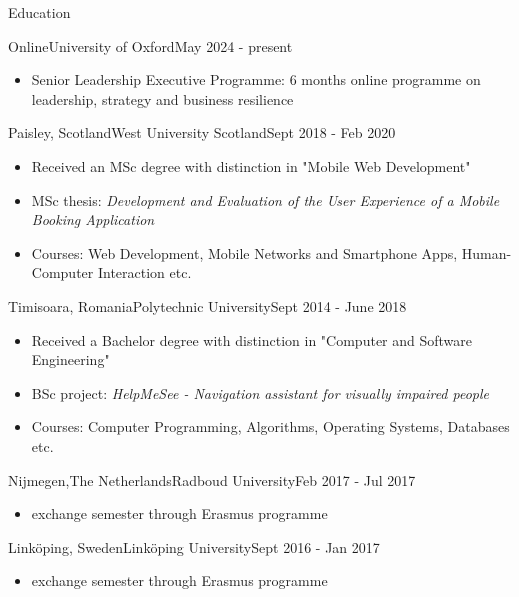 \documentclass[]{mcdowellcv}
\begin{document}
	\begin{cvsection}{Education}
		\begin{cvsubsection}{Online}{University of Oxford}{May 2024 - present}
			\begin{itemize}
			 \item Senior Leadership Executive Programme: 6 months online programme on leadership, strategy and business resilience
		 \end{itemize}
	   \end{cvsubsection}

		\begin{cvsubsection}{Paisley, Scotland}{West University Scotland}{Sept 2018 - Feb 2020}
       		\begin{itemize}
            	\item Received an MSc degree with distinction in "Mobile Web Development"
        		\item MSc thesis: \textit{Development and Evaluation of the User Experience of a Mobile Booking Application}
				\item Courses: Web Development, Mobile Networks and Smartphone Apps, Human-Computer Interaction etc.
			\end{itemize}
		\end{cvsubsection}

		\begin{cvsubsection}{Timisoara, Romania}{Polytechnic University}{Sept 2014 - June 2018}
			\begin{itemize}
				\item Received a Bachelor degree with distinction in "Computer and Software Engineering"
				\item BSc project: \textit{HelpMeSee - Navigation assistant for visually impaired people}
				\item Courses: Computer Programming, Algorithms, Operating Systems, Databases etc.
			\end{itemize}
		\end{cvsubsection}
	
		\begin{cvsubsection}{Nijmegen,The Netherlands}{Radboud University}{Feb 2017 - Jul 2017}
			\begin{itemize}
				\item exchange semester through Erasmus programme 
			\end{itemize}
		\end{cvsubsection}

		\begin{cvsubsection}{Linköping, Sweden}{Linköping University}{Sept 2016 - Jan 2017}
			\begin{itemize}
				\item exchange semester through Erasmus programme 
			\end{itemize}
		\end{cvsubsection}

	\end{cvsection}
	
\end{document}
